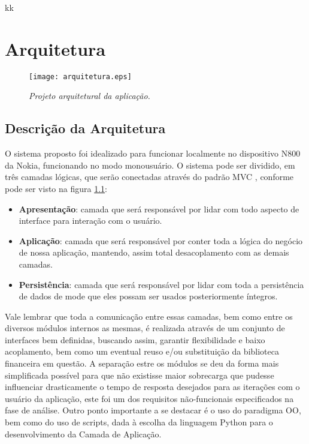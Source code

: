 kk
\chapter{Arquitetura}

\begin{figure}[!h]
 \texttt{[image: arquitetura.eps]}
 \caption{\it Projeto arquitetural da aplicação.} \label{fig:arquit}
\end{figure}

\section{Descrição da Arquitetura}
O sistema proposto foi idealizado para funcionar localmente no dispositivo N800 da Nokia, funcionando no modo monousuário. O sistema pode ser dividido, em três camadas lógicas, que serão conectadas através do padrão MVC \cite{mvc}, conforme pode ser visto na figura \ref{fig:arquit}:
\begin{itemize}
 \item \textbf{Apresentação}: camada que será responsável por lidar com todo aspecto de interface para interação com o usuário.
 \item \textbf{Aplicação}: camada que será responsável por conter toda a lógica do negócio de nossa aplicação, mantendo, assim total desacoplamento com as demais camadas.
 \item \textbf{Persistência}: camada que será responsável por lidar com toda a persistência de dados de mode que eles possam ser usados posteriormente íntegros.
\end{itemize}
Vale lembrar que toda a comunicação entre essas camadas, bem como entre os diversos módulos internos as mesmas, é realizada através de um conjunto de interfaces bem definidas, buscando assim, garantir flexibilidade e baixo acoplamento, bem como um eventual reuso e/ou substituição da biblioteca financeira em questão. A separação estre os módulos se deu da forma mais simplificada possível para que não existisse maior sobrecarga que pudesse influenciar drasticamente o tempo de resposta desejados para as iterações com o usuário da aplicação, este foi um dos requisitos não-funcionais especificados na fase de análise.
Outro ponto importante a se destacar é o uso do paradigma OO, bem como do uso de scripts, dada à escolha da linguagem Python para o desenvolvimento da Camada de Aplicação.


